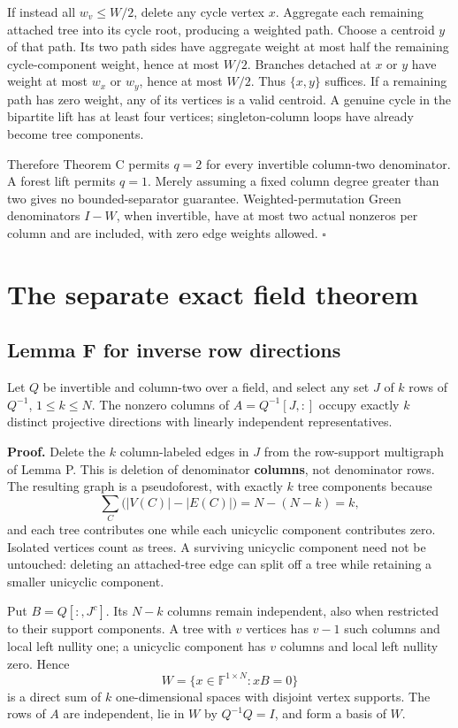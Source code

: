 \documentclass[
  11pt,
]{article}
\begin{document}
If instead all \(w_v\le W/2\), delete any cycle vertex \(x\). Aggregate
each remaining attached tree into its cycle root, producing a weighted
path. Choose a centroid \(y\) of that path. Its two path sides have
aggregate weight at most half the remaining cycle-component weight,
hence at most \(W/2\). Branches detached at \(x\) or \(y\) have weight
at most \(w_x\) or \(w_y\), hence at most \(W/2\). Thus \(\{x,y\}\)
suffices. If a remaining path has zero weight, any of its vertices is a
valid centroid. A genuine cycle in the bipartite lift has at least four
vertices; singleton-column loops have already become tree components.

Therefore Theorem C permits \(q=2\) for every invertible column-two
denominator. A forest lift permits \(q=1\). Merely assuming a fixed
column degree greater than two gives no bounded-separator guarantee.
Weighted-permutation Green denominators \(I-W\), when invertible, have
at most two actual nonzeros per column and are included, with zero edge
weights allowed. \(\square\)

\section{The separate exact field
theorem}\label{the-separate-exact-field-theorem}

\subsection{Lemma F for inverse row
directions}\label{lemma-f-for-inverse-row-directions}

Let \(Q\) be invertible and column-two over a field, and select any set
\(J\) of \(k\) rows of \(Q^{-1}\), \(1\le k\le N\). The nonzero columns
of \(A=Q^{-1}[J,:]\) occupy exactly \(k\) distinct projective directions
with linearly independent representatives.

\textbf{Proof.} Delete the \(k\) column-labeled edges in \(J\) from the
row-support multigraph of Lemma P. This is deletion of denominator
\textbf{columns}, not denominator rows. The resulting graph is a
pseudoforest, with exactly \(k\) tree components because \[
 \sum_C\bigl(|V(C)|-|E(C)|\bigr)=N-(N-k)=k,
\] and each tree contributes one while each unicyclic component
contributes zero. Isolated vertices count as trees. A surviving
unicyclic component need not be untouched: deleting an attached-tree
edge can split off a tree while retaining a smaller unicyclic component.

Put \(B=Q[:,J^c]\). Its \(N-k\) columns remain independent, also when
restricted to their support components. A tree with \(v\) vertices has
\(v-1\) such columns and local left nullity one; a unicyclic component
has \(v\) columns and local left nullity zero. Hence \[
 W=\{x\in\mathbb F^{1\times N}:xB=0\}
\] is a direct sum of \(k\) one-dimensional spaces with disjoint vertex
supports. The rows of \(A\) are independent, lie in \(W\) by
\(Q^{-1}Q=I\), and form a basis of \(W\).
\end{document}
